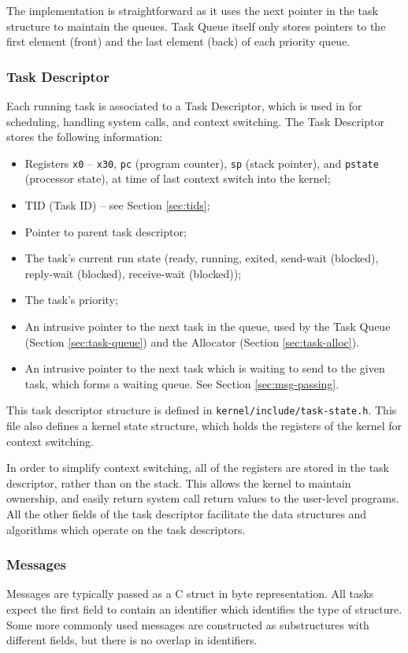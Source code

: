\documentclass[12pt, titlepage]{article}
\begin{document}
    The implementation is straightforward as it uses the next pointer in the task structure to maintain the queues.
    Task Queue itself only stores pointers to the first element (front) and the last element (back) of each priority queue.

    \subsubsection{Task Descriptor}

    Each running task is associated to a Task Descriptor, which is used in for scheduling, handling system calls, and context switching. The Task Descriptor stores the following information:
    \begin{itemize}
        \item Registers \verb`x0` -- \verb`x30`, \verb`pc` (program counter), \verb`sp` (stack pointer), and \verb`pstate` (processor state), at time of last context switch into the kernel;
        \item TID (Task ID) -- see Section \ref{sec:tids};
        \item Pointer to parent task descriptor;
        \item The task's current run state (ready, running, exited, send-wait (blocked), reply-wait (blocked), receive-wait (blocked));
        \item The task's priority;
        \item An intrusive pointer to the next task in the queue, used by the Task Queue (Section \ref{sec:task-queue}) and the Allocator (Section \ref{sec:task-alloc}).
        \item An intrusive pointer to the next task which is waiting to send to the given task, which forms a waiting queue. See Section \ref{sec:msg-passing}.
    \end{itemize}
    This task descriptor structure is defined in \verb`kernel/include/task-state.h`. This file also defines a kernel state structure, which holds the registers of the kernel for context switching.

    In order to simplify context switching, all of the registers are stored in the task descriptor, rather than on the stack. This allows the kernel to maintain ownership, and easily return system call return values to the user-level programs. All the other fields of the task descriptor facilitate the data structures and algorithms which operate on the task descriptors.

    \subsubsection{Messages}
    Messages are typically passed as a C struct in byte representation. All tasks expect the first field to contain an identifier which identifies the type of structure. Some more commonly used messages are constructed as substructures with different fields, but there is no overlap in identifiers.
\end{document}
